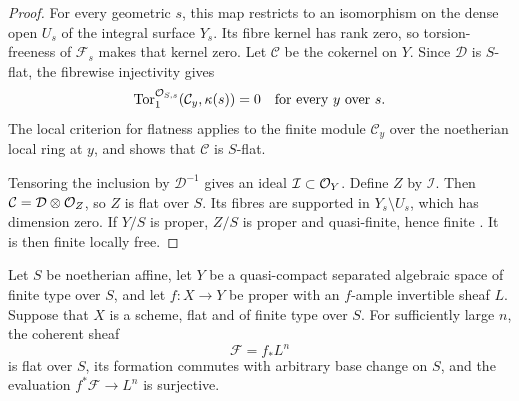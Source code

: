 \begin{proof}
For every geometric $s$, this map restricts to an isomorphism on the
dense open $U_s$ of the integral surface $Y_s$. Its fibre kernel has
rank zero, so torsion-freeness of $\mathcal F_s$ makes that kernel
zero. Let $\mathcal C$ be the cokernel on $Y$. Since $\mathcal D$ is
$S$-flat, the fibrewise injectivity gives
\[
 \operatorname{Tor}_1^{\mathcal O_{S,s}}
       (\mathcal C_y,\kappa(s))=0
 \quad\text{for every }y\text{ over }s.
\]
The local criterion for flatness \cite[Tag~00MK]{Stacks} applies to
the finite module $\mathcal C_y$ over the noetherian local ring at
$y$, and shows that $\mathcal C$ is $S$-flat.

Tensoring the inclusion by $\mathcal D^{-1}$ gives an ideal
$\mathcal I\subset\mathcal O_Y$. Define $Z$ by $\mathcal I$. Then
$\mathcal C=\mathcal D\otimes\mathcal O_Z$, so $Z$ is flat over $S$.
Its fibres are supported in $Y_s\setminus U_s$, which has dimension
zero. If $Y/S$ is proper, $Z/S$ is proper and quasi-finite, hence
finite \cite[Tag~0A4X]{Stacks}. It is then finite locally free.
\end{proof}

\begin{lemma}\label{lem:ample-pushforward-flat-basechange}
Let $S$ be noetherian affine, let $Y$ be a quasi-compact separated
algebraic space of finite type over $S$, and let $f:X\to Y$ be proper
with an $f$-ample invertible sheaf $L$. Suppose that $X$ is a scheme,
flat and of finite type over $S$. For sufficiently large $n$, the
coherent sheaf
\[
 \mathcal F=f_*L^n
\]
is flat over $S$, its formation commutes with arbitrary base change
on $S$, and the evaluation $f^*\mathcal F\to L^n$ is surjective.
\end{lemma}

